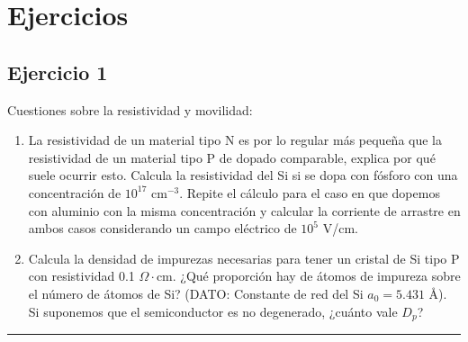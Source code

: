 \section{Ejercicios}

\subsection{Ejercicio 1}

Cuestiones sobre la resistividad y movilidad:
\begin{enumerate}[label=\alph*)]
	\item La resistividad de un material tipo N es por lo regular más pequeña que la resistividad de un material tipo P de dopado comparable, explica por qué suele ocurrir esto. Calcula la resistividad del Si si se dopa con fósforo con una concentración de \( 10^{17} \) cm\(^{-3}\). Repite el cálculo para el caso en que dopemos con aluminio con la misma concentración y calcular la corriente de arrastre en ambos casos considerando un campo eléctrico de \( 10^5 \) V/cm.

	\item Calcula la densidad de impurezas necesarias para tener un cristal de Si tipo P con resistividad 0.1 \(\Omega\cdot\)cm. ¿Qué proporción hay de átomos de impureza sobre el número de átomos de Si?
		  (DATO: Constante de red del Si \( a_0 = 5.431 \) Å). Si suponemos que el semiconductor es no degenerado, ¿cuánto vale \( D_p \)?
\end{enumerate}


\rule{\textwidth}{0.1pt} \\[2pt]

